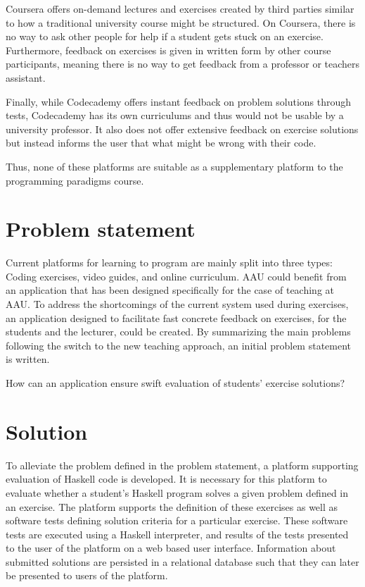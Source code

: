 Coursera offers on-demand lectures and exercises created by third parties similar to how a traditional university course might be structured.
On Coursera, there is no way to ask other people for help if a student gets stuck on an exercise.
Furthermore, feedback on exercises is given in written form by other course participants, meaning there is no way to get feedback from a professor or teachers assistant. 


Finally, while Codecademy offers instant feedback on problem solutions through tests, Codecademy has its own curriculums and thus would not be usable by a university professor. 
It also does not offer extensive feedback on exercise solutions but instead informs the user that what might be wrong with their code. 


Thus, none of these platforms are suitable as a supplementary platform to the programming paradigms course. 
\section{Problem statement}
Current platforms for learning to program are mainly split into three types: Coding exercises, video guides, and online curriculum. 
AAU could benefit from an application that has been designed specifically for the case of teaching at AAU.
To address the shortcomings of the current system used during exercises, an application designed to facilitate fast concrete feedback on exercises, for the students and the lecturer, could be created.
By summarizing the main problems following the switch to the new teaching approach, an initial problem statement is written.
\begin{displayquote}
    How can an application ensure swift evaluation of students' exercise solutions?
\end{displayquote} 

\section{Solution}
To alleviate the problem defined in the problem statement, a platform supporting evaluation of Haskell code is developed. It is necessary for this platform to evaluate whether a student's Haskell program solves a given problem defined in an exercise. The platform supports the definition of these exercises as well as software tests defining solution criteria for a particular exercise. These software tests are executed using a Haskell interpreter, and results of the tests presented to the user of the platform on a web based user interface.  
Information about submitted solutions are persisted in a relational database such that they can later be presented to users of the platform.  

